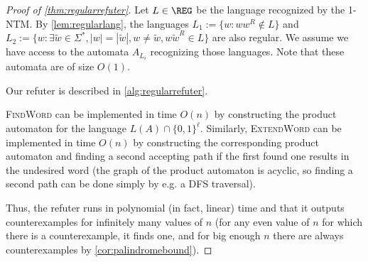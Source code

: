 \begin{proof}[Proof of \cref{thm:regularrefuter}]
Let $L \in \REG$ be the language recognized by the 1-NTM. By \cref{lem:regularlang}, the languages 
$L_1 := \{w : ww^R \not\in L\}$ and $L_2 := \{w : \exists \tilde{w} \in \Sigma^*, |w| = |\tilde{w}|, w \neq \tilde{w}, w\tilde{w}^R \in L\}$
are also regular. We assume we have access to the automata $A_{L_i}$ recognizing those languages. Note that these automata are of size $O(1)$.



Our refuter is described in \cref{alg:regularrefuter}.

\begin{algorithm}
\caption{Refuter of \cref{thm:regularrefuter}}\label{alg:regularrefuter}
\begin{algorithmic}

\end{algorithmic}
\end{algorithm}

\textsc{FindWord} can be implemented in time $O(n)$ by constructing the product automaton for the language $L(A) \cap \{0, 1\}^\ell$. 
Similarly, \textsc{ExtendWord} can be implemented in time $O(n)$ by constructing the corresponding product automaton and finding a 
second accepting path if the first found one results in the undesired word (the graph of the product automaton is acyclic, so finding
a second path can be done simply by e.g. a DFS traversal). 

Thus, the refuter runs in polynomial (in fact, linear) time and that it outputs counterexamples for infinitely many values of $n$
(for any even value of $n$ for which there is a counterexample, it finds one, and for big enough $n$ there are always counterexamples by 
\cref{cor:palindromebound}).
\end{proof}

